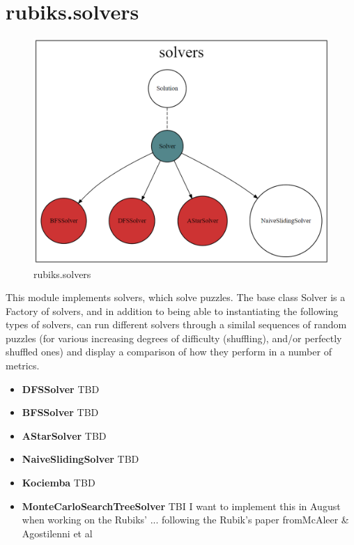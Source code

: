 \section{rubiks.solvers}
\begin{figure}[H]
\centering
\includegraphics[scale=0.25]{./Figures/codebasesolvers}
\caption[Codebase]{rubiks.solvers}
\label{fig:Codebasesolvers}
\end{figure}
This module implements solvers, which solve puzzles. The base class Solver is a Factory of solvers, and in addition to being able to instantiating the following types of solvers, can run different solvers through a similal sequences of random puzzles (for various increasing degrees of difficulty (shuffling), and/or perfectly shuffled ones) and display a comparison of how they perform in a number of metrics.

\begin{itemize}
\item \textbf{DFSSolver} TBD
\item \textbf{BFSSolver} TBD
\item \textbf{AStarSolver} TBD
\item \textbf{NaiveSlidingSolver} TBD
\item \textbf{Kociemba} TBD
\item \textbf{MonteCarloSearchTreeSolver} TBI I want to implement this in August when working on the Rubiks' ... following the Rubik's paper fromMcAleer \& Agostilenni et al \cite{https://doi.org/10.48550/arxiv.1805.07470}
\end{itemize}

